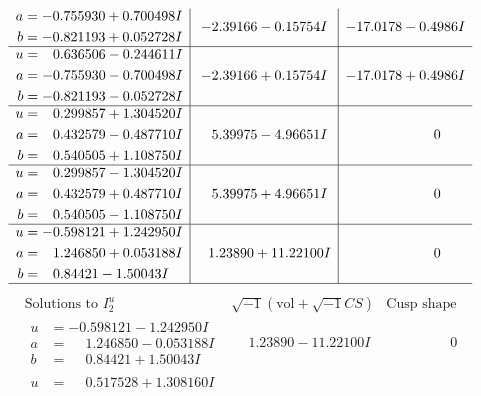 \documentclass[1p]{elsarticle_modified}
\theoremstyle{definition}
\newcommand{\I}{\sqrt{-1}}
\begin{document}
$$\begin{array}{c|c|c}
\begin{aligned}
a &= -0.755930 + 0.700498 I \\
b &= -0.821193 + 0.052728 I\end{aligned}
 & -2.39166 - 0.15754 I & -17.0178 - 0.4986 I \\ \hline\begin{aligned}
u &= \phantom{-}0.636506 - 0.244611 I \\
a &= -0.755930 - 0.700498 I \\
b &= -0.821193 - 0.052728 I\end{aligned}
 & -2.39166 + 0.15754 I & -17.0178 + 0.4986 I \\ \hline\begin{aligned}
u &= \phantom{-}0.299857 + 1.304520 I \\
a &= \phantom{-}0.432579 - 0.487710 I \\
b &= \phantom{-}0.540505 + 1.108750 I\end{aligned}
 & \phantom{-}5.39975 - 4.96651 I & \phantom{-0.000000 } 0 \\ \hline\begin{aligned}
u &= \phantom{-}0.299857 - 1.304520 I \\
a &= \phantom{-}0.432579 + 0.487710 I \\
b &= \phantom{-}0.540505 - 1.108750 I\end{aligned}
 & \phantom{-}5.39975 + 4.96651 I & \phantom{-0.000000 } 0 \\ \hline\begin{aligned}
u &= -0.598121 + 1.242950 I \\
a &= \phantom{-}1.246850 + 0.053188 I \\
b &= \phantom{-}0.84421 - 1.50043 I\end{aligned}
 & \phantom{-}1.23890 + 11.22100 I & \phantom{-0.000000 } 0\\
 \hline 
 \end{array}$$\newpage$$\begin{array}{c|c|c}  
\text{Solutions to }I^u_{2}& \I (\text{vol} + \sqrt{-1}CS) & \text{Cusp shape}\\
 \hline 
\begin{aligned}
u &= -0.598121 - 1.242950 I \\
a &= \phantom{-}1.246850 - 0.053188 I \\
b &= \phantom{-}0.84421 + 1.50043 I\end{aligned}
 & \phantom{-}1.23890 - 11.22100 I & \phantom{-0.000000 } 0 \\ \hline\begin{aligned}
u &= \phantom{-}0.517528 + 1.308160 I \\

\end{aligned}
\end{array}$$
\end{document}

